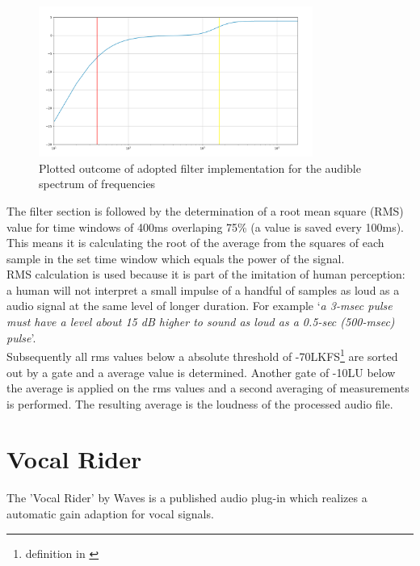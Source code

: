 \begin{figure}[H]
\includegraphics[width=0.8\textwidth]{images/filter_test}
	\centering
	\caption{Plotted outcome of adopted filter implementation for the audible spectrum of frequencies}
	\label{filterTest}
\end{figure}

The filter section is followed by the determination of a root mean square (RMS) value for time windows of 400ms overlaping 75\% (a value is saved every 100ms). This means it is calculating the root of the average from the squares of each sample in the set time window which equals the power of the signal.\\
RMS calculation is used because it is part of the imitation of human perception: a human will not interpret a small impulse of a handful of samples as loud as a audio signal at the same level of longer duration.  For example ‘\textit{a 3-msec pulse must have a level about 15 dB higher to sound as loud as a 0.5-sec (500-msec) pulse}'\cite{masterHA}.\\
Subsequently all rms values below a absolute threshold of -70LKFS\footnote{definition in \cite{ITUalgo}} are sorted out by a gate and a average value is determined. Another gate of -10LU below the average is applied on the rms values and a second averaging of measurements is performed. The resulting average is the loudness of the processed audio file.\\

\section{Vocal Rider}

The 'Vocal Rider' by Waves is a published audio plug-in which realizes a automatic gain adaption for vocal signals.

